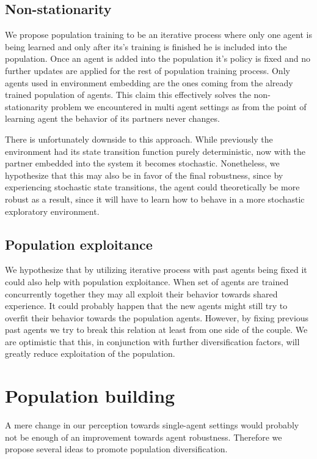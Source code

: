 \subsection{Non-stationarity}
We propose population training to be an iterative process where only one agent is being learned and only after its's training is finished he is included into the population.
Once an agent is added into the population it's policy is fixed and no further updates are applied for the rest of population training process.
Only agents used in environment embedding are the ones coming from the already trained population of agents.
This claim this effectively solves the non-stationarity problem we encountered in multi agent settings as from the point of learning agent the behavior of its partners never changes.

There is unfortunately downside to this approach.
While previously the environment had its state transition function purely deterministic, now with the partner embedded into the system it becomes stochastic.
Nonetheless, we hypothesize that this may also be in favor of the final robustness, since by experiencing stochastic state transitions, the agent could theoretically be more robust as a result, since it will have to learn how to behave in a more stochastic exploratory environment.

\subsection{Population exploitance}
We hypothesize that by utilizing iterative process with past agents being fixed it could also help with population exploitance.
When set of agents are trained concurrently together they may all exploit their behavior towards shared experience.
It could probably happen that the new agents might still try to overfit their behavior towards the population agents.
However, by fixing previous past agents we try to break this relation at least from one side of the couple.
We are optimistic that this, in conjunction with further diversification factors, will greatly reduce exploitation of the population.


\section{Population building}
A mere change in our perception towards single-agent settings would probably not be enough of an improvement towards agent robustness.
Therefore we propose several ideas to promote population diversification.
